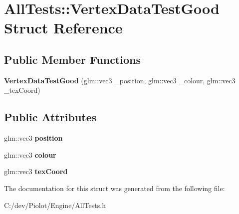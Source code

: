 \hypertarget{struct_all_tests_1_1_vertex_data_test_good}{}\section{All\+Tests\+:\+:Vertex\+Data\+Test\+Good Struct Reference}
\label{struct_all_tests_1_1_vertex_data_test_good}
\subsection*{Public Member Functions}
\begin{DoxyCompactItemize}
\item 
\mbox{\label{struct_all_tests_1_1_vertex_data_test_good_a5740a70e706251532ab79b81d4741fb8}} 
{\bfseries Vertex\+Data\+Test\+Good} (glm\+::vec3 \+\_\+position, glm\+::vec3 \+\_\+colour, glm\+::vec3 \+\_\+tex\+Coord)
\end{DoxyCompactItemize}
\subsection*{Public Attributes}
\begin{DoxyCompactItemize}
\item 
\mbox{\label{struct_all_tests_1_1_vertex_data_test_good_aa8aff262f94ad08721b5e07d874feb44}} 
glm\+::vec3 {\bfseries position}
\item 
\mbox{\label{struct_all_tests_1_1_vertex_data_test_good_a0e6963e600946b8cf8f9d5f2b99215e9}} 
glm\+::vec3 {\bfseries colour}
\item 
\mbox{\label{struct_all_tests_1_1_vertex_data_test_good_a763bfead79ef135d2487d736fe02774d}} 
glm\+::vec3 {\bfseries tex\+Coord}
\end{DoxyCompactItemize}


The documentation for this struct was generated from the following file\+:\begin{DoxyCompactItemize}
\item 
C\+:/dev/\+Piolot/\+Engine/All\+Tests.\+h\end{DoxyCompactItemize}
